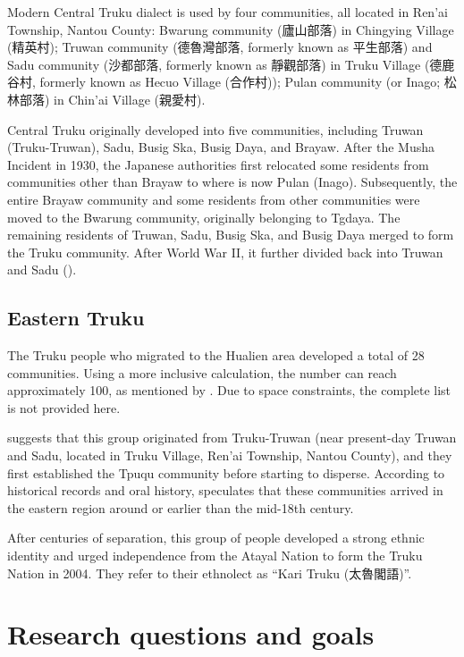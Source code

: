 Modern Central Truku dialect is used by four communities, all located in Ren'ai Township, Nantou County: Bwarung community (廬山部落) in Chingying Village (精英村); Truwan community (德魯灣部落, formerly known as 平生部落) and Sadu community (沙都部落, formerly known as 靜觀部落) in Truku Village (德鹿谷村, formerly known as Hecuo Village (合作村)); Pulan community (or Inago; 松林部落) in Chin'ai Village (親愛村).

Central Truku originally developed into five communities, including Truwan (Truku-Truwan), Sadu, Busig Ska, Busig Daya, and Brayaw. After the Musha Incident in 1930, the Japanese authorities first relocated some residents from communities other than Brayaw to where is now Pulan (Inago). Subsequently, the entire Brayaw community and some residents from other communities were moved to the Bwarung community, originally belonging to Tgdaya. The remaining residents of Truwan, Sadu, Busig Ska, and Busig Daya merged to form the Truku community. After World War II, it further divided back into Truwan and Sadu (\cite{Yap2011,Yap_ongoing_gaoshan}).

\subsection{Eastern Truku}

The Truku people who migrated to the Hualien area developed a total of 28 communities. Using a more inclusive calculation, the number can reach approximately 100, as mentioned by \textcite{liao1978Sedtheruy}. Due to space constraints, the complete list is not provided here. 

\textcite{liao1977Sedtheruy} suggests that this group originated from Truku-Truwan (near present-day Truwan and Sadu, located in Truku Village, Ren'ai Township, Nantou County), and they first established the Tpuqu community before starting to disperse. According to historical records and oral history, \textcite[200]{liao1978Sedtheruy} speculates that these communities arrived in the eastern region around or earlier than the mid-18th century.

After centuries of separation, this group of people developed a strong ethnic identity and urged independence from the Atayal Nation to form the Truku Nation in 2004. They refer to their ethnolect as ``Kari Truku (太魯閣語)''.

\section{Research questions and goals}

